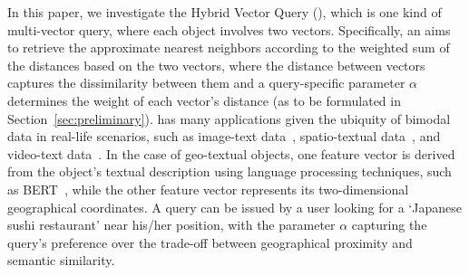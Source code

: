 In this {%
paper}, we investigate the Hybrid Vector Query (\hvq), which {%
is one kind of} multi-vector query, {%
where each object involves} two vectors. {%
Specifically,} an \hvq aims to retrieve the approximate nearest neighbors according to the weighted sum of the distances {%
based on the two} vectors, where {%
the distance between %
vectors captures the dissimilarity between them and} a %
query-specific parameter $\alpha$ determines the weight of each vector's distance (as to be formulated in Section~\ref{sec:preliminary}). {%
\hvq has many applications given the} ubiquity of bimodal data in real-life scenarios, such as image-text data~\cite{salvador2017learning,OpenImagesLocNarr,sharma2018conceptual}, spatio-textual data~\cite{chenLocationKeywordbasedQuerying2021}, and video-text data~\cite{miech19howto100m,baltruvsaitis2018multimodal}.
In the case of geo-textual objects, one feature vector is derived from the object's textual description using language processing techniques, such as BERT~\cite{devlin2018bert}, while the other feature vector represents its two-dimensional geographical coordinates. 
{\cheng A \hvq query can be issued} by a user {\cheng looking} for a `Japanese sushi restaurant' %
{\cheng near his/her} position, with the parameter $\alpha$ capturing the query’s preference over the trade-off between geographical proximity and semantic similarity. 

